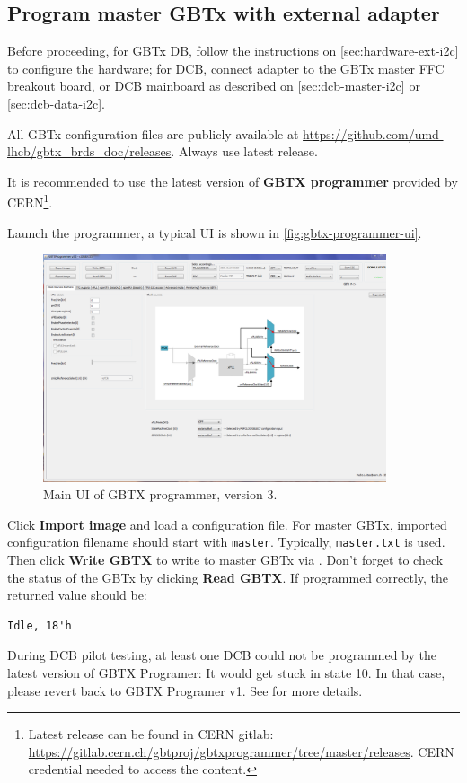 \subsection{Program master GBTx with external \itwoc adapter}
Before proceeding, for GBTx DB, follow the instructions on
\autoref{sec:hardware-ext-i2c} to configure the hardware;
for DCB, connect \itwoc adapter to the GBTx master FFC breakout board, or DCB
mainboard as described on \autoref{sec:dcb-master-i2c} or
\autoref{sec:dcb-data-i2c}.

All GBTx configuration files are publicly available at
\url{https://github.com/umd-lhcb/gbtx_brds_doc/releases}.
Always use latest release.

It is recommended to use the latest version of \textbf{GBTX programmer} provided
by CERN\footnote{
    Latest release can be found in CERN gitlab:
    \url{https://gitlab.cern.ch/gbtproj/gbtxprogrammer/tree/master/releases}.
    CERN credential needed to access the content.
}.

Launch the programmer, a typical UI is shown in
\autoref{fig:gbtx-programmer-ui}.

\begin{figure}[!ht]
    \centering
    \includegraphics[width=0.9\textwidth]{res/gbtx_programmer_v3_ui.png}
    \caption{Main UI of GBTX programmer, version 3.}
    \label{fig:gbtx-programmer-ui}
\end{figure}

Click \textbf{Import image} and load a configuration file.
For master GBTx, imported configuration filename should start with
\texttt{master}.
Typically, \texttt{master.txt} is used.
Then click \textbf{Write GBTX} to write to master GBTx via \itwoc.
Don't forget to check the status of the GBTx by clicking \textbf{Read GBTX}.
If programmed correctly, the returned value should be:

\begin{lstlisting}
Idle, 18'h
\end{lstlisting}

\begin{leftbar}
    During DCB pilot testing, at least one DCB could not be programmed by the
    latest version of GBTX Programer: It would get stuck in state 10.
    In that case, please revert back to GBTX Programer v1.
    See  for more details.
\end{leftbar}

